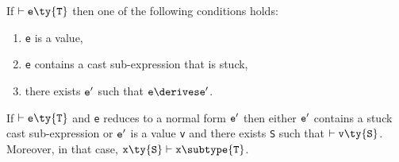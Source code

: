 \begin{lemma}[Progress]
If $\vdash {\tt e}\ty{\tt T}$ then one of the following conditions holds:
\begin{enumerate}
\item {\tt e} is a value,
\item {\tt e} contains a cast sub-expression that is stuck,
\item there exists $\tt e'$ such that $\tt e\derives e'$.
\end{enumerate}
\end{lemma}

\begin{theorem}
If $\vdash {\tt e}\ty{\tt T}$ and {\tt e}
reduces to a normal form ${\tt e'}$ then either ${\tt e'}$ contains a stuck cast sub-expression or ${\tt e'}$ is a value {\tt v} and there exists {\tt S} such that $\vdash {\tt v}\ty{\tt S}$. Moreover, in that case, ${\tt x}\ty{\tt S}\vdash{\tt x}\subtype{\tt T}$.
\end{theorem}












